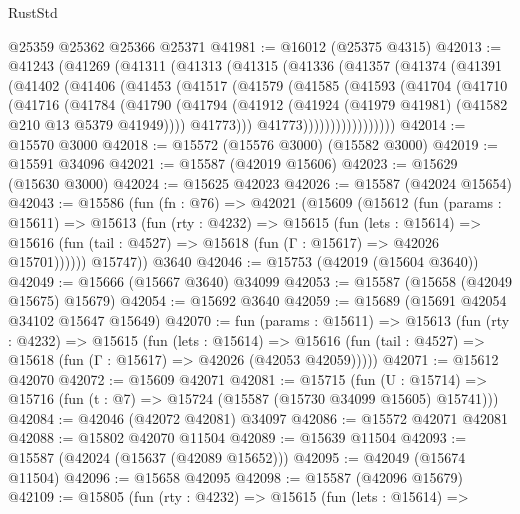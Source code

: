 \begin{lexlean}{RustStd}
\begin{coremodule}
    @25359
    @25362
    @25366
    @25371
@41981 := @16012 (@25375 @4315)
@42013 := @41243
    (@41269
      (@41311
        (@41313
          (@41315
            (@41336
              (@41357
                (@41374
                  (@41391
                    (@41402
                      (@41406
                        (@41453
                          (@41517
                            (@41579
                              (@41585
                                (@41593
                                  (@41704
                                    (@41710
                                      (@41716
                                        (@41784
                                          (@41790
                                            (@41794
                                              (@41912
                                                (@41924
                                                  (@41979 @41981)
                                                  (@41582 @210 @13 @5379 @41949))))
                                            @41773)))
                                      @41773)))))))))))))))))
@42014 := @15570 @3000
@42018 := @15572 (@15576 @3000) (@15582 @3000)
@42019 := @15591 @34096
@42021 := @15587 (@42019 @15606)
@42023 := @15629 (@15630 @3000)
@42024 := @15625 @42023
@42026 := @15587 (@42024 @15654)
@42043 := @15586
    (fun (fn : @76) =>
    @42021
      (@15609
        (@15612
          (fun (params : @15611) =>
          @15613
            (fun (rty : @4232) =>
            @15615
              (fun (lets : @15614) =>
              @15616 (fun (tail : @4527) => @15618 (fun (Γ : @15617) => @42026 @15701))))))
        @15747))
    @3640
@42046 := @15753 (@42019 (@15604 @3640))
@42049 := @15666 (@15667 @3640) @34099
@42053 := @15587 (@15658 (@42049 @15675) @15679)
@42054 := @15692 @3640
@42059 := @15689 (@15691 @42054 @34102 @15647 @15649)
@42070 := fun (params : @15611) =>
  @15613
    (fun (rty : @4232) =>
    @15615
      (fun (lets : @15614) =>
      @15616 (fun (tail : @4527) => @15618 (fun (Γ : @15617) => @42026 (@42053 @42059)))))
@42071 := @15612 @42070
@42072 := @15609 @42071
@42081 := @15715
    (fun (U : @15714) => @15716 (fun (t : @7) => @15724 (@15587 (@15730 @34099 @15605) @15741)))
@42084 := @42046 (@42072 @42081) @34097
@42086 := @15572 @42071 @42081
@42088 := @15802 @42070 @11504
@42089 := @15639 @11504
@42093 := @15587 (@42024 (@15637 (@42089 @15652)))
@42095 := @42049 (@15674 @11504)
@42096 := @15658 @42095
@42098 := @15587 (@42096 @15679)
@42109 := @15805
    (fun (rty : @4232) =>
    @15615
      (fun (lets : @15614) =>

\end{coremodule}
\end{lexlean}
